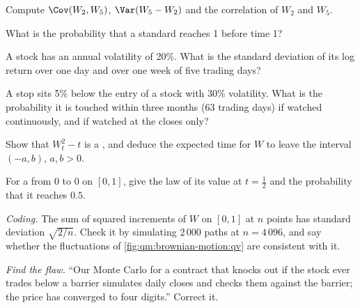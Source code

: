 \begin{exercise}[$\star$]\label{exo:qm:brownian-motion:1}
Compute $\Cov(W_2, W_5)$, $\Var(W_5 - W_2)$ and the correlation of $W_2$ and $W_5$.
\end{exercise}

\begin{exercise}[$\star$]\label{exo:qm:brownian-motion:2}
What is the probability that a standard  reaches 1 before time 1?
\end{exercise}

\begin{exercise}[$\star$]\label{exo:qm:brownian-motion:3}
A stock has an annual volatility of 20\%. What is the standard deviation of its log return
over one day and over one week of five trading days?
\end{exercise}

\begin{exercise}[$\star\star$]\label{exo:qm:brownian-motion:4}
A stop sits 5\% below the entry of a stock with 30\% volatility. What is the probability it is
touched within three months (63 trading days) if watched continuously, and if watched at the
closes only?
\end{exercise}

\begin{exercise}[$\star\star$]\label{exo:qm:brownian-motion:5}
Show that $W_t^2 - t$ is a , and deduce the expected time for $W$ to leave the
interval $(-a, b)$, $a, b > 0$.
\end{exercise}

\begin{exercise}[$\star\star$]\label{exo:qm:brownian-motion:6}
For a  from 0 to 0 on $[0, 1]$, give the law of its value at $t = \tfrac12$ and the
probability that it reaches $0.5$.
\end{exercise}

\begin{exercise}[$\star\star\star$]\label{exo:qm:brownian-motion:7}
\emph{Coding.} The sum of squared increments of $W$ on $[0,1]$ at $n$ points has standard
deviation $\sqrt{2/n}$. Check it by simulating 2\,000 paths at $n = 4\,096$, and say whether the
fluctuations of \cref{fig:qm:brownian-motion:qv} are consistent with it.
\end{exercise}

\begin{exercise}[$\star\star\star$]\label{exo:qm:brownian-motion:8}
\emph{Find the flaw.} ``Our Monte Carlo for a contract that knocks out if the stock ever
trades below a barrier simulates daily closes and checks them against the barrier; the price
has converged to four digits.'' Correct it.
\end{exercise}

